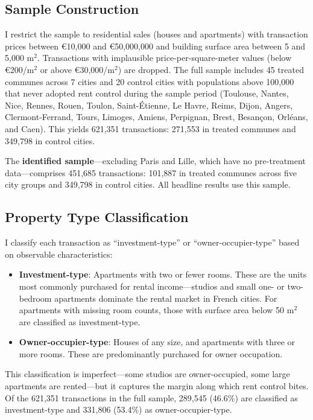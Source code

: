 \documentclass[12pt]{article}
\begin{document}
\subsection{Sample Construction}

I restrict the sample to residential sales (houses and apartments) with transaction prices between \euro{10,000} and \euro{50,000,000} and building surface area between 5 and 5,000 m$^2$. Transactions with implausible price-per-square-meter values (below \euro{200}/m$^2$ or above \euro{30,000}/m$^2$) are dropped. The full sample includes 45 treated communes across 7 cities and 20 control cities with populations above 100,000 that never adopted rent control during the sample period (Toulouse, Nantes, Nice, Rennes, Rouen, Toulon, Saint-\'Etienne, Le Havre, Reims, Dijon, Angers, Clermont-Ferrand, Tours, Limoges, Amiens, Perpignan, Brest, Besan\c{c}on, Orl\'eans, and Caen). This yields 621,351 transactions: 271,553 in treated communes and 349,798 in control cities.

The \textbf{identified sample}---excluding Paris and Lille, which have no pre-treatment data---comprises 451,685 transactions: 101,887 in treated communes across five city groups and 349,798 in control cities. All headline results use this sample.

\subsection{Property Type Classification}

I classify each transaction as ``investment-type'' or ``owner-occupier-type'' based on observable characteristics:

\begin{itemize}
\item \textbf{Investment-type}: Apartments with two or fewer rooms. These are the units most commonly purchased for rental income---studios and small one- or two-bedroom apartments dominate the rental market in French cities. For apartments with missing room counts, those with surface area below 50 m$^2$ are classified as investment-type.

\item \textbf{Owner-occupier-type}: Houses of any size, and apartments with three or more rooms. These are predominantly purchased for owner occupation.
\end{itemize}

This classification is imperfect---some studios are owner-occupied, some large apartments are rented---but it captures the margin along which rent control bites. Of the 621,351 transactions in the full sample, 289,545 (46.6\%) are classified as investment-type and 331,806 (53.4\%) as owner-occupier-type.
\end{document}
